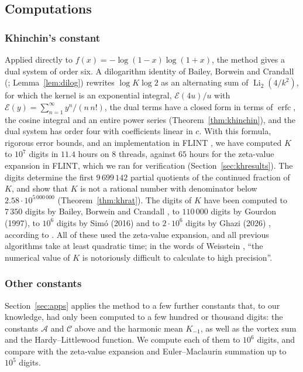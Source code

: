 \documentclass[11pt]{amsart}
\theoremstyle{definition}
\theoremstyle{remark}
\newcommand{\Eip}{\mathcal{E}}
\newcommand{\erfc}{\operatorname{erfc}}
\newcommand{\Li}{\operatorname{Li}}
\begin{document}
\subsection{Computations}
\subsubsection{Khinchin's constant}
Applied directly to $f(x) = -\log(1-x)\log(1+x)$, the method gives a dual system of order six.
A dilogarithm identity of Bailey, Borwein and Crandall (\cite[\S3]{BBC97}; Lemma~\ref{lem:dilog}) rewrites
$\log K\log 2$ as an alternating sum of $\Li_2(4/k^2)$, for which the kernel is an exponential integral, $\Eip(4u)/u$ with $\Eip(y) = \sum_{n=1}^{\infty}y^n/(n\,n!)$,
the dual terms have a closed form in terms of $\erfc$, the cosine integral and an entire power series
(Theorem~\ref{thm:khinchin}), and the dual system has order four with coefficients linear in $c$. With this
formula, rigorous error bounds, and an implementation in FLINT \cite{FLINT}, we have computed $K$ to $10^7$ digits in $11.4$ hours on $8$ threads, against
$65$ hours for the zeta-value expansion in FLINT, which we ran for verification (Section~\ref{sec:khresults}). The
digits determine the first $9\,699\,142$ partial quotients of the continued fraction of $K$, and show that $K$ is not a
rational number with denominator below $2.58\cdot10^{5\,000\,000}$ (Theorem~\ref{thm:khrat}). The digits of $K$
have been computed to $7\,350$ digits by Bailey, Borwein and Crandall \cite{BBC97}, to
$110\,000$ digits by Gourdon (1997), to $10^6$ digits by Sim\'o (2016) and to $2\cdot10^6$ digits by
Ghazi (2026) \cite{Gha26}, according to \cite{MWKdigits}. All of these used the zeta-value expansion, and all previous
algorithms take at least quadratic time; in the words of Weisstein \cite{MWKdigits}, ``the numerical value of $K$ is
notoriously difficult to calculate to high precision''.

\subsubsection{Other constants}
Section~\ref{sec:apps} applies the method to a few further constants that,
to our knowledge, had only been computed to a few hundred or thousand digits: the constants $\mathcal A$ and
$\mathcal C$ above and the harmonic mean $K_{-1}$, as well as the vortex sum and the Hardy--Littlewood function. We
compute each of them to $10^6$ digits, and compare with the zeta-value expansion and Euler--Maclaurin summation up to
$10^5$ digits.
\end{document}
